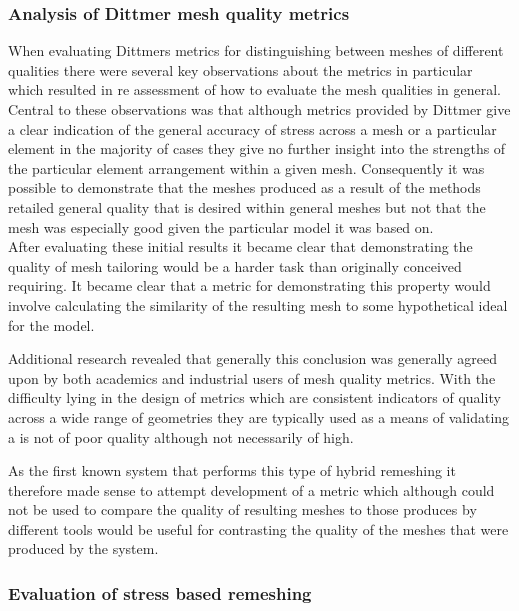 \documentclass{article}
\begin{document}
\subsubsection{Analysis of Dittmer mesh quality metrics}
When evaluating Dittmers metrics for distinguishing between meshes of different qualities there were several key observations about the metrics in particular which resulted in re assessment of how to evaluate the mesh qualities in general.
Central to these observations was that although metrics provided by Dittmer give a clear indication of the general accuracy of stress across a mesh or a particular element in the majority of cases they give no further insight into the strengths of the particular element arrangement within a given mesh. Consequently it was possible to demonstrate that the meshes produced as a result of the methods retailed general quality that is desired within general meshes but not that the mesh was especially good given the particular model it was based on. \\


\noindent
After evaluating these initial results it became clear that demonstrating the quality of mesh tailoring would be a harder task than originally conceived requiring. It became clear that a metric for demonstrating this property would involve calculating the similarity of the resulting mesh to some hypothetical ideal for the model.

Additional research revealed that generally this conclusion was generally agreed upon by both academics and industrial users of mesh quality metrics. With the difficulty lying in the design of metrics which are consistent indicators of quality across a wide range of geometries they are typically used as a means of validating a is not of poor quality although not necessarily of high.

As the first known system that performs this type of hybrid remeshing it therefore made sense to attempt development of a metric which although could not be used to compare the quality of resulting meshes to those produces by different tools would be useful for contrasting the quality of the meshes that were produced by the system.






\subsubsection{Evaluation of stress based remeshing}
\end{document}
